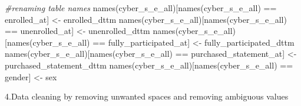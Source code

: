 \documentclass[
]{article}
\newenvironment{Shaded}{\begin{snugshade}}{\end{snugshade}}
\newcommand{\CommentTok}[1]{\textcolor[rgb]{0.56,0.35,0.01}{\textit{#1}}}
\newcommand{\FunctionTok}[1]{\textcolor[rgb]{0.00,0.00,0.00}{#1}}
\newcommand{\NormalTok}[1]{#1}
\newcommand{\OtherTok}[1]{\textcolor[rgb]{0.56,0.35,0.01}{#1}}
\newcommand{\SpecialCharTok}[1]{\textcolor[rgb]{0.00,0.00,0.00}{#1}}
\newcommand{\StringTok}[1]{\textcolor[rgb]{0.31,0.60,0.02}{#1}}
\begin{document}
\begin{Shaded}
\begin{Highlighting}[]
\CommentTok{\#renaming table names }
\FunctionTok{names}\NormalTok{(cyber\_s\_e\_all)[}\FunctionTok{names}\NormalTok{(cyber\_s\_e\_all) }\SpecialCharTok{==} \StringTok{\textquotesingle{}enrolled\_at\textquotesingle{}}\NormalTok{] }\OtherTok{\textless{}{-}} \StringTok{\textquotesingle{}enrolled\_dttm\textquotesingle{}}
\FunctionTok{names}\NormalTok{(cyber\_s\_e\_all)[}\FunctionTok{names}\NormalTok{(cyber\_s\_e\_all) }\SpecialCharTok{==} \StringTok{\textquotesingle{}unenrolled\_at\textquotesingle{}}\NormalTok{] }\OtherTok{\textless{}{-}} \StringTok{\textquotesingle{}unenrolled\_dttm\textquotesingle{}}
\FunctionTok{names}\NormalTok{(cyber\_s\_e\_all)[}\FunctionTok{names}\NormalTok{(cyber\_s\_e\_all) }\SpecialCharTok{==} \StringTok{\textquotesingle{}fully\_participated\_at\textquotesingle{}}\NormalTok{] }\OtherTok{\textless{}{-}} \StringTok{\textquotesingle{}fully\_participated\_dttm\textquotesingle{}}
\FunctionTok{names}\NormalTok{(cyber\_s\_e\_all)[}\FunctionTok{names}\NormalTok{(cyber\_s\_e\_all) }\SpecialCharTok{==} \StringTok{\textquotesingle{}purchased\_statement\_at\textquotesingle{}}\NormalTok{] }\OtherTok{\textless{}{-}} \StringTok{\textquotesingle{}purchased\_statement\_dttm\textquotesingle{}}
\FunctionTok{names}\NormalTok{(cyber\_s\_e\_all)[}\FunctionTok{names}\NormalTok{(cyber\_s\_e\_all) }\SpecialCharTok{==} \StringTok{\textquotesingle{}gender\textquotesingle{}}\NormalTok{] }\OtherTok{\textless{}{-}} \StringTok{\textquotesingle{}sex\textquotesingle{}}
\end{Highlighting}
\end{Shaded}

\hfill\break
4.Data cleaning by removing unwanted spaces and removing ambiguous
values
\end{document}
